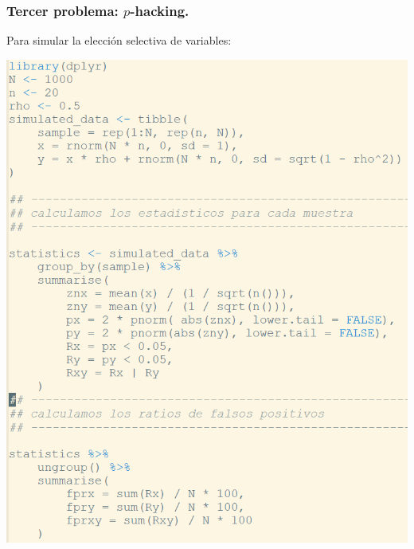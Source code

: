 \documentclass[9pt]{beamer}
\begin{document}
\begin{frame}
  \frametitle{Tercer problema: $p$-hacking.}
  Para simular la elección selectiva de variables:\\
  \begin{center}
    \includegraphics[height=0.9\textheight]{images/R-script-1}
  \end{center}
\end{frame}

\end{document}

